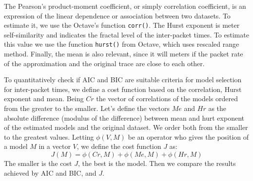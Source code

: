 The Pearson's product-moment coefficient, or simply correlation coefficient,  is an expression of the linear dependence or association between two datasets. To estimate it, we use the Octave's function \texttt{corr()}. The Hurst exponent is meter self-similarity and indicates the fractal level of the inter-packet times.  To estimate this value we use the function \texttt{hurst()} from Octave, which uses rescaled range method. Finally, the mean is also relevant, since it will meters if the packet rate of the approximation and the original trace are close to each other. 

To quantitatively check if AIC and BIC are suitable criteria for model selection for inter-packet times, we define a cost function based on the correlation, Hurst exponent and mean. Being $Cr$ the vector of correlations of the models ordered from the greater to the smaller. Let's define the vectors $Me$ and $Hr$ as the absolute difference (modulus of the difference) between mean and hurt exponent of the estimated models and the original dataset.  We order both from the smaller to the greatest values. Letting $\phi(V, M)$ be an operator who gives the position of a model $M$ in a vector $V$, we define the cost function $J$ as:
\begin{equation}
J(M) = \phi(Cr, M) + \phi(Me, M) + \phi(Hr, M)
\end{equation}
The smaller is the cost $J$, the best is the model. Then we compare the results achieved by AIC and BIC, and $J$.


